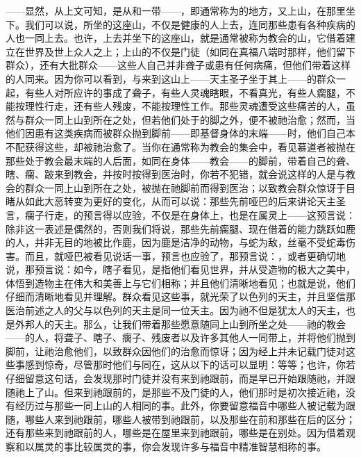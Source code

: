——显然，从上文可知，是从和一带——，即通常称为的地方，又上山，在那里坐下。我们可以说，所坐的这座山，不仅是健康的人上去，连同那些患有各种疾病的人也一同上去。也许，上去并坐下的这座山，就是通常被称为教会的山，它借着建立在世界及世上众人之上；上山的不仅是门徒（如同在真福八端时那样，他们留下群众），还有大批群众——这些人自己并非聋子或患有任何病痛，但他们带着这样的人同来。因为你可以看到，与来到这山上——天主圣子坐于其上——的群众一起，有些人对所应许的事成了聋子，有些人灵魂瞎眼，不看真光，有些人瘸腿，不能按理性行走，还有些人残废，不能按理性工作。那些灵魂遭受这些痛苦的人，虽然与群众一同上山到所在之处，但若他们处于的脚之外，便不被祂治愈；然而，当他们因患有这类疾病而被群众抛到脚前——即基督身体的末端——时，他们自己本不配获得这些，却被祂治愈了。当你在通常称为教会的集会中，看见慕道者被抛在那些处于教会最末端的人后面，如同在身体——教会——的脚前，带着自己的聋、瞎、瘸、跛来到教会，并按时按得到医治时，你若不犯错，就会说这样的人是与教会的群众一同上山到所在之处，被抛在祂脚前而得到医治；以致教会群众惊讶于目睹从如此大恶转变为更好的变化，从而可以说：那些先前哑巴的后来讲论天主圣言，瘸子行走，的预言得以应验，不仅是在身体上，也是在属灵上——这预言说：除非这一表述是偶然的，否则我们将说，那些先前瘸腿、现在借着的能力跳跃如鹿的人，并非无目的地被比作鹿，因为鹿是洁净的动物，与蛇为敌，丝毫不受蛇毒伤害。而且，就哑巴被看见说话一事，预言也应验了，那预言说：，或者更确切地说，那预言说：如今，瞎子看见，是指他们看见世界，并从受造物的极大之美中，体悟到造物主在伟大和美善上与它们相称；并且他们清晰地看见；也就是说，他们仔细而清晰地看见并理解。群众看见这些事，就光荣了以色列的天主，并且坚信那医治前述之人的父与以色列的天主是同一位天主。因为祂不但是犹太人的天主，也是外邦人的天主。那么，让我们带着那些愿意随同上山到所坐之处——祂的教会——的人，将聋子、瞎子、瘸子、残废者以及许多其他人一同带上，并将他们抛到脚前，让祂治愈他们，以致群众因他们的治愈而惊讶；因为经上并未记载门徒对这些事感到惊奇，尽管那时他们与同在，这从以下的话可以显明：等等；也许，你若仔细留意这句话，会发现那时门徒并没有来到祂跟前，而是早已开始跟随祂，并跟随祂上了山。但来到祂跟前的，是那些不及门徒的人，他们那时是初次接近祂，没有经历过与那些一同上山的人相同的事。此外，你要留意福音中哪些人被记载为跟随，哪些人来到祂跟前，哪些人被带到祂跟前，以及那些在前和那些在后的区分；还有那些来到祂跟前的人，哪些是在屋里来到祂跟前，哪些是在别处。因为借着观察和以属灵的事比较属灵的事，你会发现许多与福音中精准智慧相称的事。\par

